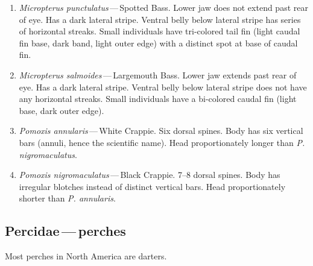 \documentclass[11pt]{article}
\begin{document}
\begin{enumerate}
	\item\textit{Micropterus punctulatus}\,—\,Spotted Bass. Lower jaw does not extend past rear of eye. Has a dark lateral stripe. Ventral belly below lateral stripe has series of horizontal streaks. Small individuals have tri-colored tail fin (light caudal fin base, dark band, light outer edge) with a distinct spot at base of caudal fin.

	\item\textit{Micropterus salmoides}\,—\,Largemouth Bass. Lower jaw extends past rear of eye. Has a dark lateral stripe. Ventral belly below lateral stripe does not have any horizontal streaks. Small individuals have a bi-colored caudal fin (light base, dark outer edge). 

	\item\textit{Pomoxis annularis}\,—\,White Crappie. Six dorsal spines. Body has six vertical bars (annuli, hence the scientific name). Head proportionately longer than \textit{P. nigromaculatus}.

	\item\textit{Pomoxis nigromaculatus}\,—\,Black Crappie. 7–8 dorsal spines. Body has irregular blotches instead of distinct vertical bars. Head proportionately shorter than \textit{P. annularis}.
\end{enumerate}

\subsection*{Percidae\,—\,perches}

Most perches in North America are darters.
\end{document}
